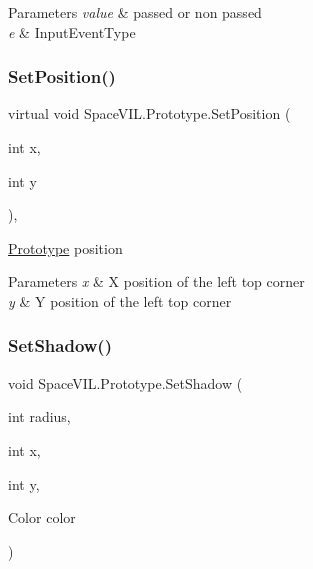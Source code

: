 \begin{DoxyParams}{Parameters}
{\em value} & passed or non passed \\
\hline
{\em e} & Input\+Event\+Type \\
\hline
\end{DoxyParams}
\mbox{\label{class_space_v_i_l_1_1_prototype_a85ca4db19baa118edbb48eb93302a6b3}} 
\subsubsection{\texorpdfstring{Set\+Position()}{SetPosition()}}
{\footnotesize\ttfamily virtual void Space\+V\+I\+L.\+Prototype.\+Set\+Position (\begin{DoxyParamCaption}\item[{int}]{x,  }\item[{int}]{y }\end{DoxyParamCaption})\hspace{0.3cm}{\ttfamily [inline]}, {\ttfamily [virtual]}}



\mbox{\hyperlink{class_space_v_i_l_1_1_prototype}{Prototype}} position 


\begin{DoxyParams}{Parameters}
{\em x} & X position of the left top corner \\
\hline
{\em y} & Y position of the left top corner \\
\hline
\end{DoxyParams}
\mbox{\label{class_space_v_i_l_1_1_prototype_a98da84353a0b057b2720d77a12367b2b}} 
\subsubsection{\texorpdfstring{Set\+Shadow()}{SetShadow()}}
{\footnotesize\ttfamily void Space\+V\+I\+L.\+Prototype.\+Set\+Shadow (\begin{DoxyParamCaption}\item[{int}]{radius,  }\item[{int}]{x,  }\item[{int}]{y,  }\item[{Color}]{color }\end{DoxyParamCaption})\hspace{0.3cm}{\ttfamily [inline]}}



